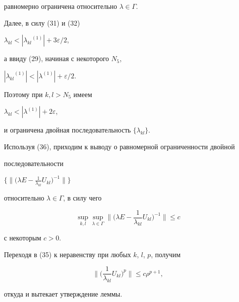 \begin{pf}
равномерно ограничена относительно $\lambda\in\Gamma$.





Далее, в силу (31) и (32)


$\lambda_{kl}<|{\lambda_{kl}}^{(1)}|+3{\varepsilon}/2$,


а ввиду (29), начиная с некоторого $N_5$,


$|{\lambda_{kl}}^{(1)}|<|\lambda^{(1)}|+{\varepsilon}/2$.


Поэтому при $k,l>N_5$ имеем


$\lambda_{kl}<|\lambda^{(1)}|+2{\varepsilon}$,


и ограничена двойная последовательность $\{\lambda_{kl}\}$.


Используя (36), приходим к выводу о равномерной ограниченности двойной


последовательности


$\big\{\big\|\big(\lambda E-\frac{1}


{\lambda_{kl}}U_{kl}\big)^{-1}\big\|\big\}$


относительно $\lambda\in\Gamma$, в силу чего


$$


\sup_{k,l}\sup_{\lambda\in\Gamma}


\bigg\|\bigg(\lambda E-\frac{1}{\lambda_{kl}}U_{kl}\bigg)^{-1}\bigg\|\le c


$$


с некоторым $c>0$.


Переходя в (35) к неравенству при любых $k$, $l$, $p$, получим


\begin{equation}


\bigg\|\bigg(\frac{1}{\lambda_{kl}}U_{kl}\bigg)^p\bigg\|\le c\rho^{p+1},


\end{equation}


откуда и вытекает утверждение леммы.


\end{pf}





